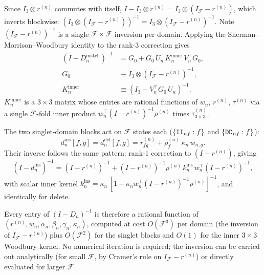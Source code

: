 \documentclass{article}
\newcommand\ext{r}
\newcommand\notext{\rho}
\newcommand\dom{n}
\newcommand\nfrag{\mathcal{F}}
\newcommand\fragdist{w}
\newcommand\tkftrans{\tau}
\newcommand\ins{{\tt I}}
\newcommand\del{{\tt D}}
\newcommand\frag{f}
\newcommand\destfrag{g}
\begin{document}
Since $I_{3} \otimes \ext^{(\dom)}$ commutes with itself,
$I - I_3 \otimes \ext^{(\dom)} = I_3 \otimes (I_\nfrag - \ext^{(\dom)})$,
which inverts blockwise: $(I_3 \otimes (I_\nfrag - \ext^{(\dom)}))^{-1}
= I_3 \otimes (I_\nfrag - \ext^{(\dom)})^{-1}$.
Note $(I_\nfrag - \ext^{(\dom)})^{-1}$ is a single
$\nfrag \times \nfrag$ inversion per domain.
Applying the Sherman--Morrison--Woodbury identity to the rank-3
correction gives
\begin{equation}\label{eq:mixdom-Dmatch-inverse}
\begin{aligned}
(I - D_\dom^{\text{match}})^{-1}
&= G_0
+ G_0\, U_\dom\, K_\dom^{\text{inner}}\, V_\dom^\top G_0, \\
G_0 &\equiv I_{3} \otimes (I_\nfrag - \ext^{(\dom)})^{-1}, \\
K_\dom^{\text{inner}}
&\equiv (I_3 - V_\dom^\top G_0\, U_\dom)^{-1}.
\end{aligned}
\end{equation}
$K_\dom^{\text{inner}}$ is a $3 \times 3$ matrix whose entries are
rational functions of $\fragdist_\dom$, $\ext^{(\dom)}$,
$\tkftrans^{(\dom)}$ via a single $\nfrag$-fold inner product
$\fragdist_\dom^\top (I - \ext^{(\dom)})^{-1} \notext^{(\dom)}$
times $\tkftrans^{(\dom)}_{3\times 3}$.

The two singlet-domain blocks act on $\nfrag$ states each
($\{\ins\ins_{\dom\frag} : \frag\}$ and
$\{\del\del_{\dom\frag} : \frag\}$):
\[
d_\dom^{\text{ins}}[\frag,\destfrag]
= d_\dom^{\text{del}}[\frag,\destfrag]
= \ext^{(\dom)}_{\frag\destfrag} + \notext^{(\dom)}_\frag\,
  \kappa_\dom\, \fragdist_{\dom,\destfrag}.
\]
Their inverse follows the same pattern: rank-1 correction to
$(I - \ext^{(\dom)})$, giving
\[
(I - d_\dom^{\text{ins}})^{-1}
= (I - \ext^{(\dom)})^{-1}
+ (I - \ext^{(\dom)})^{-1} \notext^{(\dom)}\,
  k_\dom^{\text{ins}}\,
  \fragdist_\dom^\top (I - \ext^{(\dom)})^{-1},
\]
with scalar inner kernel
$k_\dom^{\text{ins}}
= \kappa_\dom \, [1 - \kappa_\dom \fragdist_\dom^\top
(I - \ext^{(\dom)})^{-1} \notext^{(\dom)}]^{-1}$,
and identically for delete.

Every entry of $(I - D_\dom)^{-1}$ is therefore a rational function of
$(\ext^{(\dom)}, \fragdist_\dom, \alpha_\dom, \beta_\dom, \gamma_\dom,
\kappa_\dom)$, computed at cost $O(\nfrag^3)$ per domain (the inversion
of $I_\nfrag - \ext^{(\dom)}$) plus $O(\nfrag^2)$ for the singlet
blocks and $O(1)$ for the inner $3 \times 3$ Woodbury kernel.
No numerical iteration is required; the inversion can be carried out
analytically (for small $\nfrag$, by Cramer's rule on
$I_\nfrag - \ext^{(\dom)}$) or directly evaluated for larger $\nfrag$.
\end{document}
